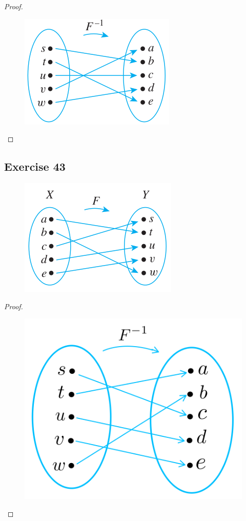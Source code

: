 \documentclass[14pt]{extarticle}
\begin{document}
\begin{proof}
\begin{figure}[ht!]
\centering
\includegraphics[scale=0.5]{../images/7.2.42.sol.png}
\end{figure}
\end{proof}

\subsection{Exercise 43}
\begin{figure}[ht!]
\centering
\includegraphics[scale=0.5]{../images/7.2.43.png}
\end{figure}

\begin{proof}
\begin{figure}[ht!]
\centering
\includegraphics[scale=0.4]{../images/7.2.43.sol.png}
\end{figure}
\end{proof}
\end{document}
